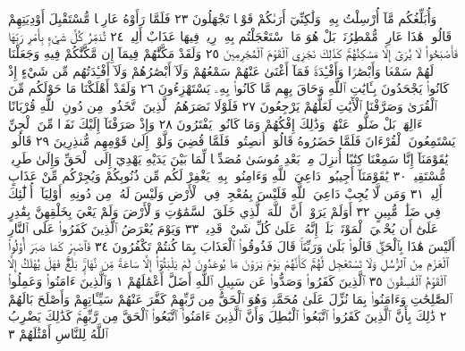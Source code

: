 وَأُبَلِّغُكُم مَّآ أُرْسِلْتُ بِهِۦ وَلَٰكِنِّيٓ أَرَىٰكُمْ قَوْمࣰا تَجْهَلُونَ ٢٣ فَلَمَّا
رَأَوْهُ عَارِضࣰا مُّسْتَقْبِلَ أَوْدِيَتِهِمْ قَالُوا۟ هَٰذَا عَارِضࣱ مُّمْطِرُنَاۚ
بَلْ هُوَ مَا ٱسْتَعْجَلْتُم بِهِۦۖ رِيحࣱ فِيهَا عَذَابٌ أَلِيمࣱ ٢٤ تُدَمِّرُ كُلَّ
شَيْءِۭ بِأَمْرِ رَبِّهَا فَأَصْبَحُوا۟ لَا يُرَىٰٓ إِلَّا مَسَٰكِنُهُمْۚ كَذَٰلِكَ نَجْزِي
ٱلْقَوْمَ ٱلْمُجْرِمِينَ ٢٥ وَلَقَدْ مَكَّنَّٰهُمْ فِيمَآ إِن مَّكَّنَّٰكُمْ فِيهِ
وَجَعَلْنَا لَهُمْ سَمْعࣰا وَأَبْصَٰرࣰا وَأَفْـِٔدَةࣰ فَمَآ أَغْنَىٰ عَنْهُمْ سَمْعُهُمْ
وَلَآ أَبْصَٰرُهُمْ وَلَآ أَفْـِٔدَتُهُم مِّن شَيْءٍ إِذْ كَانُوا۟ يَجْحَدُونَ بِـَٔايَٰتِ
ٱللَّهِ وَحَاقَ بِهِم مَّا كَانُوا۟ بِهِۦ يَسْتَهْزِءُونَ ٢٦ وَلَقَدْ أَهْلَكْنَا
مَا حَوْلَكُم مِّنَ ٱلْقُرَىٰ وَصَرَّفْنَا ٱلْأٓيَٰتِ لَعَلَّهُمْ يَرْجِعُونَ ٢٧
فَلَوْلَا نَصَرَهُمُ ٱلَّذِينَ ٱتَّخَذُوا۟ مِن دُونِ ٱللَّهِ قُرْبَانًا ءَالِهَةَۢۖ
بَلْ ضَلُّوا۟ عَنْهُمْۚ وَذَٰلِكَ إِفْكُهُمْ وَمَا كَانُوا۟ يَفْتَرُونَ ٢٨
وَإِذْ صَرَفْنَآ إِلَيْكَ نَفَرࣰا مِّنَ ٱلْجِنِّ يَسْتَمِعُونَ ٱلْقُرْءَانَ
فَلَمَّا حَضَرُوهُ قَالُوٓا۟ أَنصِتُوا۟ۖ فَلَمَّا قُضِيَ وَلَّوْا۟ إِلَىٰ قَوْمِهِم
مُّنذِرِينَ ٢٩ قَالُوا۟ يَٰقَوْمَنَآ إِنَّا سَمِعْنَا كِتَٰبًا أُنزِلَ مِنۢ
بَعْدِ مُوسَىٰ مُصَدِّقࣰا لِّمَا بَيْنَ يَدَيْهِ يَهْدِيٓ إِلَى ٱلْحَقِّ
وَإِلَىٰ طَرِيقࣲ مُّسْتَقِيمࣲ ٣٠ يَٰقَوْمَنَآ أَجِيبُوا۟ دَاعِيَ ٱللَّهِ وَءَامِنُوا۟
بِهِۦ يَغْفِرْ لَكُم مِّن ذُنُوبِكُمْ وَيُجِرْكُم مِّنْ عَذَابٍ أَلِيمࣲ ٣١
وَمَن لَّا يُجِبْ دَاعِيَ ٱللَّهِ فَلَيْسَ بِمُعْجِزࣲ فِي ٱلْأَرْضِ وَلَيْسَ لَهُۥ
مِن دُونِهِۦٓ أَوْلِيَآءُۚ أُو۟لَٰٓئِكَ فِي ضَلَٰلࣲ مُّبِينٍ ٣٢ أَوَلَمْ يَرَوْا۟
أَنَّ ٱللَّهَ ٱلَّذِي خَلَقَ ٱلسَّمَٰوَٰتِ وَٱلْأَرْضَ وَلَمْ يَعْيَ بِخَلْقِهِنَّ
بِقَٰدِرٍ عَلَىٰٓ أَن يُحْـِۧيَ ٱلْمَوْتَىٰۚ بَلَىٰٓۚ إِنَّهُۥ عَلَىٰ كُلِّ شَيْءࣲ قَدِيرࣱ ٣٣
وَيَوْمَ يُعْرَضُ ٱلَّذِينَ كَفَرُوا۟ عَلَى ٱلنَّارِ أَلَيْسَ هَٰذَا بِٱلْحَقِّۖ قَالُوا۟
بَلَىٰ وَرَبِّنَاۚ قَالَ فَذُوقُوا۟ ٱلْعَذَابَ بِمَا كُنتُمْ تَكْفُرُونَ ٣٤
فَٱصْبِرْ كَمَا صَبَرَ أُو۟لُوا۟ ٱلْعَزْمِ مِنَ ٱلرُّسُلِ وَلَا تَسْتَعْجِل
لَّهُمْۚ كَأَنَّهُمْ يَوْمَ يَرَوْنَ مَا يُوعَدُونَ لَمْ يَلْبَثُوٓا۟ إِلَّا سَاعَةࣰ
مِّن نَّهَارِۭۚ بَلَٰغࣱۚ فَهَلْ يُهْلَكُ إِلَّا ٱلْقَوْمُ ٱلْفَٰسِقُونَ ٣٥
ٱلَّذِينَ كَفَرُوا۟ وَصَدُّوا۟ عَن سَبِيلِ ٱللَّهِ أَضَلَّ أَعْمَٰلَهُمْ ١ وَٱلَّذِينَ ءَامَنُوا۟
وَعَمِلُوا۟ ٱلصَّٰلِحَٰتِ وَءَامَنُوا۟ بِمَا نُزِّلَ عَلَىٰ مُحَمَّدࣲ وَهُوَ ٱلْحَقُّ مِن رَّبِّهِمْ كَفَّرَ
عَنْهُمْ سَيِّـَٔاتِهِمْ وَأَصْلَحَ بَالَهُمْ ٢ ذَٰلِكَ بِأَنَّ ٱلَّذِينَ كَفَرُوا۟ ٱتَّبَعُوا۟ ٱلْبَٰطِلَ وَأَنَّ
ٱلَّذِينَ ءَامَنُوا۟ ٱتَّبَعُوا۟ ٱلْحَقَّ مِن رَّبِّهِمْۚ كَذَٰلِكَ يَضْرِبُ ٱللَّهُ لِلنَّاسِ أَمْثَٰلَهُمْ ٣
